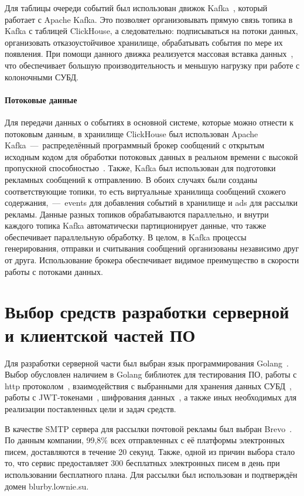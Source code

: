 Для таблицы очереди событий был использован движок Kafka~\cite{bib29}, который работает с Apache Kafka. Это позволяет организовывать прямую связь топика в Kafka с таблицей ClickHouse, а следовательно: подписываться на потоки данных, организовать отказоустойчивое хранилище, обрабатывать события по мере их появления. При помощи данного движка реализуется массовая вставка данных~\cite{bib38}, что обеспечивает большую производительность и меньшую нагрузку при работе с колоночными СУБД.

\paragraph{Потоковые данные}\mbox{}

Для передачи данных о событиях в основной системе, которые можно отнести к потоковым данным, в хранилище ClickHouse был использован Apache Kafka~---~распределённый программный брокер сообщений с открытым исходным кодом для обработки потоковых данных в реальном времени с высокой пропускной способностью~\cite{bib23}. Также, Kafka был использован для подготовки рекламных сообщений к отправлению. В обоих случаях были созданы соответствующие топики, то есть виртуальные хранилища сообщений схожего содержания,~---~events для добавления событий в хранилище и ads для рассылки рекламы. Данные разных топиков обрабатываются параллельно, и внутри каждого топика Kafka автоматически партиционирует данные, что также обеспечивает параллельную обработку. В целом, в Kafka процессы генерирования, отправки и считывания сообщений организованы независимо друг от друга. Использование брокера обеспечивает видимое преимущество в скорости работы с потоками данных.

\section{Выбор средств разработки серверной и клиентской частей ПО}
Для разработки серверной части был выбран язык программирования Golang~\cite{bib24}. Выбор обусловлен наличием в Golang библиотек для тестирования ПО, работы с http протоколом~\cite{bib25}, взаимодействия с выбранными для хранения данных СУБД~\cite{bib26}, работы с JWT-токенами~\cite{bib28}, шифрования данных~\cite{bib27}, а также иных необходимых для реализации поставленных цели и задач средств.

В качестве SMTP сервера для рассылки почтовой рекламы был выбран Brevo~\cite{bib35}. По данным компании, 99,8\% всех отправленных с её платформы электронных писем, доставляются в течение 20 секунд. Также, одной из причин выбора стало то, что сервис предоставляет 300 бесплатных электронных писем в день при использовании бесплатного плана. Для рассылки был использован и подтверждён домен blurby.lownie.su.

